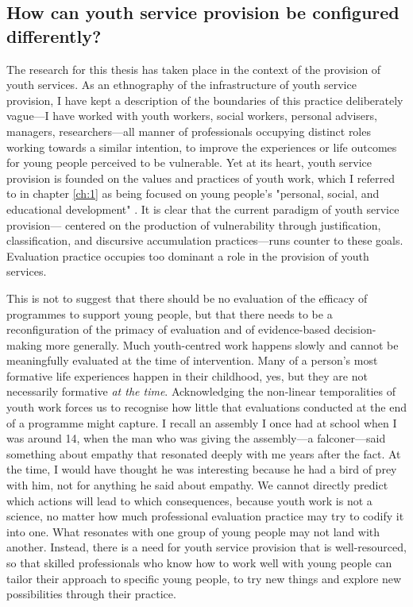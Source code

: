 \subsection{How can youth service provision be configured differently?}
The research for this thesis has taken place in the context of the provision of youth services. As an ethnography of the infrastructure of youth service provision, I have kept a description of the boundaries of this practice deliberately vague—I have worked with youth workers, social workers, personal advisers, managers, researchers—all manner of professionals occupying distinct roles working towards a similar intention, to improve the experiences or life outcomes for young people perceived to be vulnerable. Yet at its heart, youth service provision is founded on the values and practices of youth work, which I referred to in chapter \ref{ch:1} as being focused on young people's "personal, social, and educational development" \citep[p. 110]{ord_young_2022}. It is clear that the current paradigm of youth service provision— centered on the production of vulnerability through justification, classification, and discursive accumulation practices—runs counter to these goals. Evaluation practice occupies too dominant a role in the provision of youth services.

This is not to suggest that there should be no evaluation of the efficacy of programmes to support young people, but that there needs to be a reconfiguration of the primacy of evaluation and of evidence-based decision-making more generally. Much youth-centred work happens slowly and cannot be meaningfully evaluated at the time of intervention. Many of a person's most formative life experiences happen in their childhood, yes, but they are not necessarily formative \textit{at the time}. Acknowledging the non-linear temporalities of youth work forces us to recognise how little that evaluations conducted at the end of a programme might capture. I recall an assembly I once had at school when I was around 14, when the man who was giving the assembly—a falconer—said something about empathy that resonated deeply with me years after the fact. At the time, I would have thought he was interesting because he had a bird of prey with him, not for anything he said about empathy. We cannot directly predict which actions will lead to which consequences, because youth work is not a science, no matter how much professional evaluation practice may try to codify it into one. What resonates with one group of young people may not land with another. Instead, there is a need for youth service provision that is well-resourced, so that skilled professionals who know how to work well with young people can tailor their approach to specific young people, to try new things and explore new possibilities through their practice.

